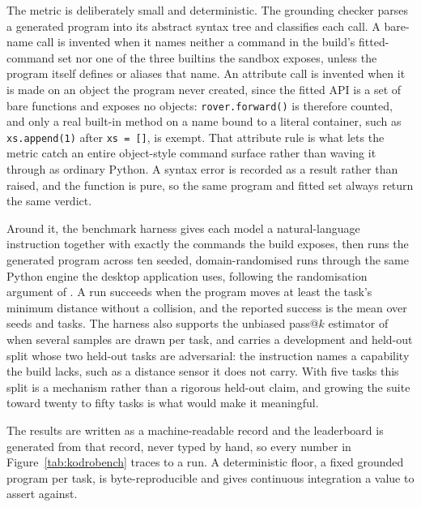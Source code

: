 \documentclass[11pt,a4paper]{report}
\begin{document}
The metric is deliberately small and deterministic. The grounding checker parses a generated program into its abstract syntax tree and classifies each call. A bare-name call is invented when it names neither a command in the build's fitted-command set nor one of the three builtins the sandbox exposes, unless the program itself defines or aliases that name. An attribute call is invented when it is made on an object the program never created, since the fitted API is a set of bare functions and exposes no objects: \texttt{rover.forward()} is therefore counted, and only a real built-in method on a name bound to a literal container, such as \texttt{xs.append(1)} after \texttt{xs = []}, is exempt. That attribute rule is what lets the metric catch an entire object-style command surface rather than waving it through as ordinary Python. A syntax error is recorded as a result rather than raised, and the function is pure, so the same program and fitted set always return the same verdict.

Around it, the benchmark harness gives each model a natural-language instruction together with exactly the commands the build exposes, then runs the generated program across ten seeded, domain-randomised runs through the same Python engine the desktop application uses, following the randomisation argument of \citet{tobin2017}. A run succeeds when the program moves at least the task's minimum distance without a collision, and the reported success is the mean over seeds and tasks. The harness also supports the unbiased pass@$k$ estimator of \citet{chen2021} when several samples are drawn per task, and carries a development and held-out split whose two held-out tasks are adversarial: the instruction names a capability the build lacks, such as a distance sensor it does not carry. With five tasks this split is a mechanism rather than a rigorous held-out claim, and growing the suite toward twenty to fifty tasks is what would make it meaningful.

The results are written as a machine-readable record and the leaderboard is generated from that record, never typed by hand, so every number in Figure~\ref{tab:kodrobench} traces to a run. A deterministic floor, a fixed grounded program per task, is byte-reproducible and gives continuous integration a value to assert against.
\end{document}
